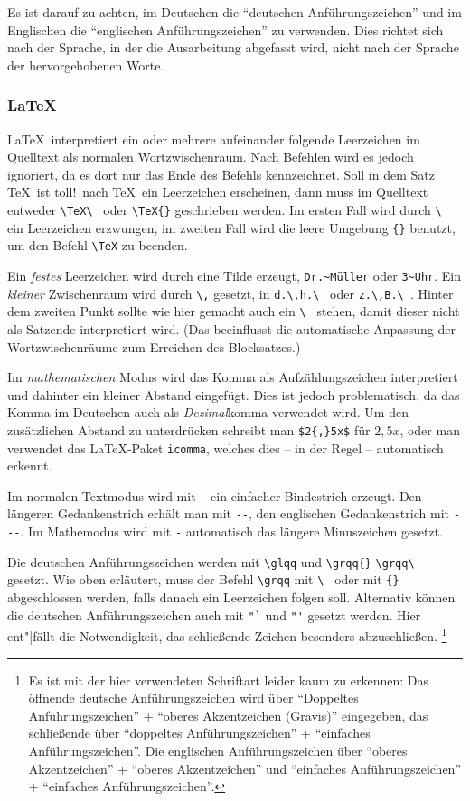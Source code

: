 Es ist darauf zu achten, im Deutschen die "`deutschen Anführungszeichen"' und im Englischen die ``englischen Anführungszeichen'' zu verwenden.
Dies richtet sich nach der Sprache, in der die Ausarbeitung abgefasst wird, nicht nach der Sprache der hervorgehobenen Worte.


\subsubsection*{\LaTeX}

\LaTeX\ interpretiert ein oder mehrere aufeinander folgende Leerzeichen im Quelltext als normalen Wortzwischenraum.
Nach Befehlen wird es jedoch ignoriert, da es dort nur das Ende des Befehls kennzeichnet.
Soll \zB in dem Satz \glqq\TeX\ ist toll!\grqq\ nach \glqq\TeX\grqq\ ein Leerzeichen erscheinen, dann muss im Quelltext entweder \verb*|\TeX\ | oder \verb|\TeX{}| geschrieben werden.
Im ersten Fall wird durch \verb*|\ | ein Leerzeichen erzwungen, im zweiten Fall wird die leere Umgebung \verb|{}| benutzt, um den Befehl \verb|\TeX| zu beenden.

Ein \emph{festes} Leerzeichen wird durch eine Tilde erzeugt, \zB \verb|Dr.~Müller| oder \verb|3~Uhr|.
Ein \emph{kleiner} Zwischenraum wird durch \verb|\,| gesetzt, \zB in \verb*|d.\,h.\ | oder \verb*|z.\,B.\ |.
Hinter dem zweiten Punkt sollte wie hier gemacht auch ein \verb*|\ | stehen, damit dieser nicht als Satzende interpretiert wird.
(Das beeinflusst die automatische Anpassung der Wortzwischenräume zum Erreichen des Blocksatzes.)

Im \emph{mathematischen} Modus wird das Komma als Aufzählungszeichen interpretiert und dahinter ein kleiner Abstand eingefügt.
Dies ist jedoch problematisch, da das Komma im Deutschen auch als \emph{Dezimal}komma verwendet wird.
Um den zusätzlichen Abstand zu unterdrücken schreibt man \zB \verb|$2{,}5x$| für \glqq $2{,}5x$\grqq, oder man verwendet das \LaTeX-Paket \verb|icomma|, welches dies -- in der Regel -- automatisch erkennt.

Im normalen Textmodus wird mit \verb|-| ein einfacher Bindestrich erzeugt.
Den längeren Gedankenstrich erhält man mit \verb|--|, den englischen Gedankenstrich mit \verb|---|. Im Mathemodus wird mit \verb|-| automatisch das längere Minuszeichen gesetzt.

Die deutschen Anführungszeichen werden mit \verb|\glqq| und \verb|\grqq{}| \bzw \verb*|\grqq\ | gesetzt.
Wie oben erläutert, muss der Befehl \verb|\grqq| mit \verb*|\ | oder mit \verb|{}| abgeschlossen werden, falls danach ein Leerzeichen folgen soll.
Alternativ können die deutschen Anführungszeichen auch mit \verb|"`| und \verb|"'| gesetzt werden.
Hier ent"|fällt die Notwendigkeit, das schließende Zeichen besonders abzuschließen.%
\footnote{Es ist mit der hier verwendeten Schriftart leider kaum zu erkennen:
  Das öffnende deutsche Anführungszeichen wird über "`Doppeltes Anführungszeichen"' + "`oberes Akzentzeichen (Gravis)"' eingegeben, das schließende über "`doppeltes Anführungszeichen"' + "`einfaches Anführungszeichen"'.
  Die englischen Anführungszeichen über "`oberes Akzentzeichen"' + "`oberes Akzentzeichen"' und "`einfaches Anführungszeichen"' + "`einfaches Anführungszeichen"'.}

